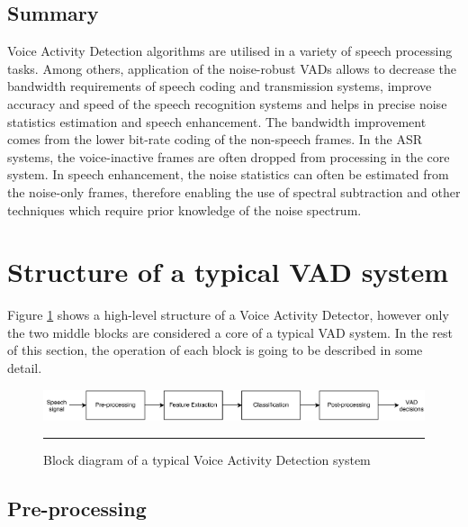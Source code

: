 \subsection{Summary}

Voice Activity Detection algorithms are utilised in a variety of speech processing tasks. Among others, application of the noise-robust VADs allows to decrease the bandwidth requirements of speech coding and transmission systems, improve accuracy and speed of the speech recognition systems and helps in precise noise statistics estimation and speech enhancement. The bandwidth improvement comes from the lower bit-rate coding of the non-speech frames. In the ASR systems, the voice-inactive frames are often dropped from processing in the core system. In speech enhancement, the noise statistics can often be estimated from the noise-only frames, therefore enabling the use of spectral subtraction and other techniques which require prior knowledge of the noise spectrum.


\section{Structure of a typical VAD system}

Figure \ref{fig:VADStructure} shows a high-level structure of a Voice Activity Detector, however only the two middle blocks are considered a core of a typical VAD system. In the rest of this section, the operation of each block is going to be described in some detail. \bigskip

\begin{figure}[htbp]
	\centering
		\includegraphics[width=1.0\columnwidth]{Figures/VADStructure.png}
		\rule{37em}{0.5pt}
	\caption[Block diagram of a typical Voice Activity Detection system]{Block diagram of a typical Voice Activity Detection system}
	\label{fig:VADStructure}
\end{figure}

\subsection{Pre-processing}

